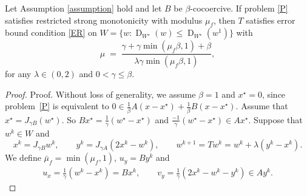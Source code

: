 \documentclass[ijoc,sglanonrev]{informs4}
\DeclareMathOperator{\dist}{D}
\begin{document}
\begin{proposition}
Let Assumption \ref{assumption} hold and let $B$ be $\beta$-cocoercive.  If   problem \eqref{P}  satisfies restricted strong monotonicity with modulus $\mu_f$, then $T$ satisfies  error bound condition \eqref{ER} on $W=\{w: \dist_{W^\star}(w)\leq  \dist_{W^\star}(w^1)\}$ with 
\[
\mu \;=\; \frac{\gamma + \gamma\min(\mu_f \beta, 1) + \beta}{\lambda\gamma\min(\mu_f \beta, 1)},
\]
for any $\lambda\in(0,2)$ and $0<\gamma\leq \beta$.
\end{proposition}
\begin{proof}{Proof.} %
 Without loss of generality, we assume \(\beta=1\) and $x^\star=0$, since problem~\eqref{P} is equivalent to $0\in \tfrac{1}{\beta}A(x-x^\star)+ \tfrac{1}{\beta}B(x-x^\star)$. Assume that $x^\star=J_{\gamma B}(w^\star)$. So $Bx^\star=\tfrac{1}{\gamma}(w^\star-x^\star)$ and $\tfrac{-1}{\gamma}(w^\star-x^\star)\in Ax^\star$. Suppose that $w^k\in W$ and 
\[
x^k=J_{\gamma B}w^k,\qquad y^k=J_{\gamma A}(2x^k-w^k),\qquad  w^{k+1}=T w^k=w^k+\lambda(y^k-x^k).
\]
We define $\bar \mu_f=\min(\mu_f,1)$, $u_y=By^k$ and
\begin{align}\label{XX}
u_x=\tfrac1\gamma(w^k-x^k)=Bx^k,\qquad
v_y=\tfrac1\gamma(2x^k-w^k-y^k)\in Ay^k.
\end{align}


\end{proof}
\end{document}
